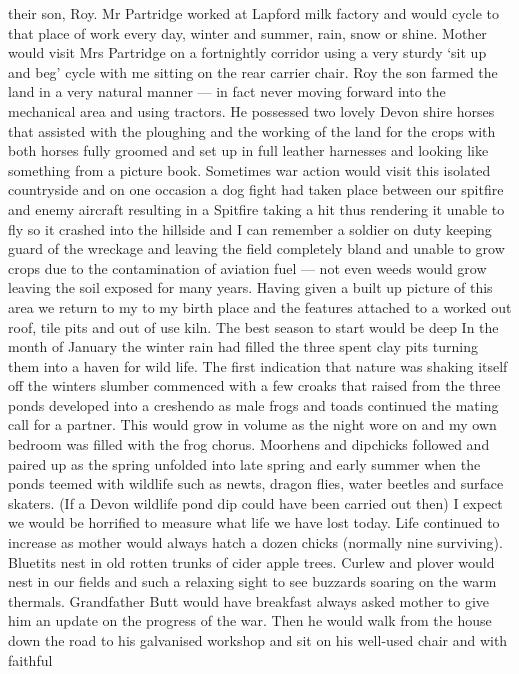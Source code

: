 their son, Roy. Mr Partridge worked at Lapford milk factory and would cycle to
that place of work every day, winter and summer, rain, snow or shine. Mother
would visit Mrs Partridge on a fortnightly corridor using a very sturdy ‘sit up
and beg' cycle with me sitting on the rear carrier chair. Roy the son farmed
the land in a very natural manner — in fact never moving forward into the
mechanical area and using tractors. He possessed two lovely Devon shire horses
that assisted with the ploughing and the working of the land for the crops with
both horses fully groomed and set up in full leather harnesses and looking like
something from a picture book. Sometimes war action would visit this isolated
countryside and on one occasion a dog fight had taken place between our
spitfire and enemy aircraft resulting in a Spitfire taking a hit thus rendering
it unable to fly so it crashed into the hillside and I can remember a soldier
on duty keeping guard of the wreckage and leaving the field completely bland
and unable to grow crops due to the contamination of aviation fuel — not even
weeds would grow leaving the soil exposed for many years. Having given a built
up picture of this area we return to my to my birth place and the features
attached to a worked out roof, tile pits and out of use kiln. The best season
to start would be deep In the month of January the winter rain had filled the
three spent clay pits turning them into a haven for wild life. The first
indication that nature was shaking itself off the winters slumber commenced
with a few croaks that raised from the three ponds developed into a creshendo
as male frogs and toads continued the mating call for a partner. This would
grow in volume as the night wore on and my own bedroom was filled with the frog
chorus. Moorhens and dipchicks followed and paired up as the spring unfolded
into late spring and early summer when the ponds teemed with wildlife such as
newts, dragon flies, water beetles and surface skaters. (If a Devon wildlife
pond dip could have been carried out then) I expect we would be horrified to
measure what life we have lost today. Life continued to increase as mother
would always hatch a dozen chicks (normally nine surviving). Bluetits nest in
old rotten trunks of cider apple trees. Curlew and plover would nest in our
fields and such a relaxing sight to see buzzards soaring on the warm thermals.
Grandfather Butt would have breakfast always asked mother to give him an update
on the progress of the war. Then he would walk from the house down the road to
his galvanised workshop and sit on his well-used chair and with faithful
